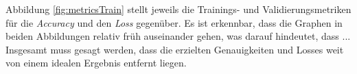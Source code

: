 Abbildung \ref{fig:metricsTrain} stellt jeweils die Trainings- und Validierungsmetriken für die \textit{Accuracy} und den \textit{Loss} gegenüber.
Es ist erkennbar, dass die Graphen in beiden Abbildungen relativ früh auseinander gehen, was darauf hindeutet, dass ...
Insgesamt muss gesagt werden, dass die erzielten Genauigkeiten und Losses weit von einem idealen Ergebnis entfernt liegen.
